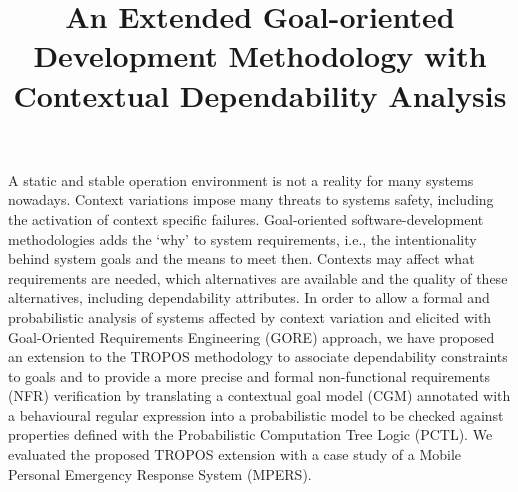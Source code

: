 \documentclass[mestrado]{unb-cic}
\title{An Extended Goal-oriented Development Methodology with Contextual Dependability Analysis}%
\begin{document}
  \maketitle

  \begin{dedicatoria}

  \end{dedicatoria}

  \begin{agradecimentos}

  \end{agradecimentos}


  \begin{resumo}
  A static and stable operation environment is not a reality for many systems nowadays. Context variations impose many threats to systems safety, including the activation of context specific failures. Goal-oriented software-development methodologies adds the `why' to system requirements, i.e., the intentionality behind system goals and the means to meet then. Contexts may affect what requirements are needed, which alternatives are available and the quality of these alternatives, including dependability attributes. In order to allow a formal and probabilistic analysis of systems affected by context variation and elicited with Goal-Oriented Requirements Engineering (GORE) approach, we have proposed an extension to the TROPOS methodology to associate dependability constraints to goals and to provide a more precise and formal non-functional requirements (NFR) verification by translating a contextual goal model (CGM) annotated with a behavioural regular expression into a probabilistic model to be checked against properties defined with the Probabilistic Computation Tree Logic (PCTL). We evaluated the proposed TROPOS extension with a case study of a Mobile Personal Emergency Response System (MPERS).
  
  
  \end{resumo}

  \begin{abstract}
  	
  \end{abstract}
  \tableofcontents
  \listoffigures
  \listoftables

\renewcommand{\appendixname}{Anexo}


  \textual
  
  
  
  
    
      
  
  
      
  

  \postextual
  
  

\appendix
\end{document}
